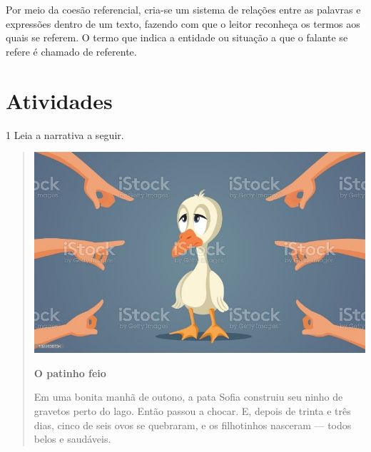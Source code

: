\begin{conteudo}
\begin{conteudo}
\begin{conteudo}
\begin{conteudo}
{Por meio da coesão referencial, cria-se um sistema de relações entre as
palavras e expressões dentro de um texto, fazendo com que o leitor
reconheça os termos aos quais se referem. O termo que indica a entidade
ou situação a que o falante se refere é chamado de referente.
}

\pagebreak
\section{Atividades}

\num{1} Leia a narrativa a seguir.



\begin{quote}
\includegraphics[width=\textwidth]{media/image36.jpeg}

\textbf{O patinho feio}

Em uma bonita manhã de outono, a pata Sofia construiu seu ninho de
gravetos perto do lago. Então passou a chocar. E, depois de trinta e
três dias, cinco de seis ovos se quebraram, e os filhotinhos nasceram
--- todos belos e saudáveis.


\end{quote}
\end{conteudo}
\end{conteudo}
\end{conteudo}
\end{conteudo}
